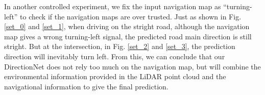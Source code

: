 \documentclass[letterpaper,10 pt,conference]{ieeeconf}  %
\begin{document}
In another controlled experiment, we fix the input navigation map as ``turning-left'' to check if the navigation maps are over trusted. Just as shown in Fig. \ref{set_0} and \ref{set_1}, when driving on the stright road, although the navigation map gives a wrong turning-left signal, the predicted road main direction is still stright. But at the intersection, in Fig. \ref{set_2} and \ref{set_3}, the prediction direction will inevitably turn left. From this, we can conclude that our DirectionNet does not rely too much on the navigation map, but will combine the environmental information provided in the LiDAR point cloud and the navigational information to give the final prediction.

\begin{figure}
    \centering
    \setlength{\belowcaptionskip}{-0.5cm}
    \subfigure[] {
}
\end{figure}
\end{document}

